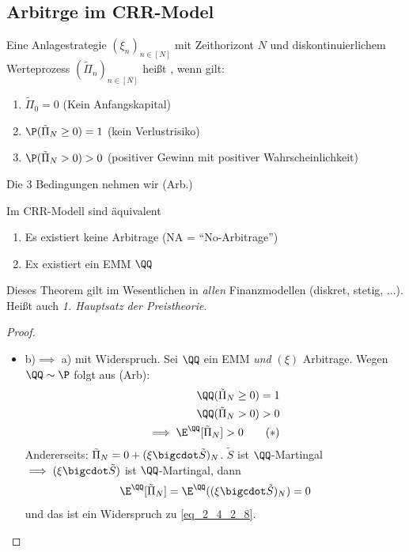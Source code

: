 \subsection*{Arbitrge im CRR-Model}
\begin{definition}
	Eine Anlagestrategie $(\xi_n)_{n \in[N]}$ mit Zeithorizont $N$ und diskontinuierlichem Werteprozess $(\tilde{\Pi}_n)_{n \in [N]}$ heißt , wenn gilt:
	\begin{enumerate}
		\item $\tilde{\Pi}_0 = 0$ (Kein Anfangskapital)
		\item $\P(\tilde{\Pi}_N \ge 0) = 1$ (kein Verlustrisiko)
		\item $\P(\tilde{\Pi}_N > 0) > 0$ (positiver Gewinn mit positiver Wahrscheinlichkeit)
	\end{enumerate}
	Die 3 Bedingungen nehmen wir (Arb.) %
\end{definition}
\begin{theorem} %
	Im CRR-Modell sind äquivalent
	\begin{enumerate}
		\item Es existiert keine Arbitrage (NA = ``No-Arbitrage'')
		\item Ex existiert ein EMM $\QQ$ 
	\end{enumerate}
\end{theorem}
\begin{*remark}
	Dieses Theorem gilt im Wesentlichen in \emph{allen} Finanzmodellen (diskret, stetig, ...). Heißt auch \emph{1. Hauptsatz der Preistheorie}.
\end{*remark}
\begin{proof}
	\begin{itemize}
		\item b)$ \implies$ a) mit Widerspruch. Sei $\QQ$ ein EMM \emph{und} $(\xi)$ Arbitrage. Wegen $\QQ \sim \P$ folgt aus (Arb):
		\begin{align*}
			\QQ(\tilde{\Pi}_N \ge 0) = 1\\
			\QQ(\tilde{\Pi}_N > 0) > 0\\
			\implies \E^{\QQ}[\tilde{\Pi}_N] > 0 \tag{$\ast$}\label{eq_2_4_2_8}
		\end{align*}
		Andererseits: $\tilde{\Pi}_N = 0 + (\xi \bigcdot \tilde{S})_N$. $\tilde{S}$ ist $\QQ$-Martingal $\implies (\xi \bigcdot \tilde{S})$ ist $\QQ$-Martingal, dann
		\begin{align*}
			\E^{\QQ}[\tilde{\Pi}_N] = \E^{\QQ}((\xi \bigcdot \tilde{S})_N) = 0
		\end{align*}
		und das ist ein Widerspruch zu \eqref{eq_2_4_2_8}.
	\end{itemize}
\end{proof}